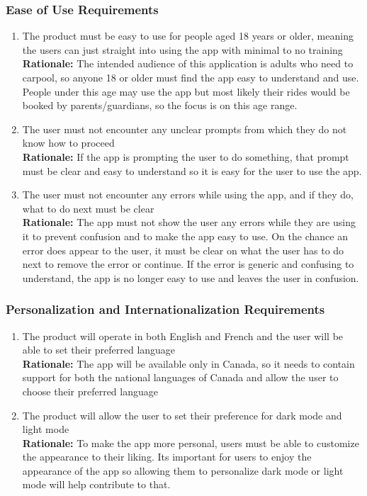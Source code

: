 \documentclass[]{article}
\begin{document}
\subsubsection{Ease of Use Requirements}
\label{ssub:ease_of_use_requirements}
\begin{enumerate}[{UH-EOU}1. ]
	\item The product must be easy to use for people aged 18 years or older, meaning the users can just straight into using the app with minimal to no training \\
	{\bf Rationale:} The intended audience of this application is adults who need to carpool, so anyone 18 or older must find the app easy to understand and use. People under this age may use the app but most likely their rides would be booked by parents/guardians, so the focus is on this age range.
	\item The user must not encounter any unclear prompts from which they do not know how to proceed \\
	{\bf Rationale:} If the app is prompting the user to do something, that prompt must be clear and easy to understand so it is easy for the user to use the app.
	\item The user must not encounter any errors while using the app, and if they do, what to do next must be clear \\
	{\bf Rationale:} The app must not show the user any errors while they are using it to prevent confusion and to make the app easy to use. On the chance an error does appear to the user, it must be clear on what the user has to do next to remove the error or continue. If the error is generic and confusing to understand, the app is no longer easy to use and leaves the user in confusion.
\end{enumerate}

\subsubsection{Personalization and Internationalization Requirements}
\label{ssub:personalization_and_internationalization_requirements}
\begin{enumerate}[{UH-PI}1. ]
	\item The product will operate in both English and French and the user will be able to set their preferred language \\
	{\bf Rationale:} The app will be available only in Canada, so it needs to contain support for both the national languages of Canada and allow the user to choose their preferred language
	\item The product will allow the user to set their preference for dark mode and light mode \\
	{\bf Rationale:} To make the app more personal, users must be able to customize the appearance to their liking. Its important for users to enjoy the appearance of the app so allowing them to personalize dark mode or light mode will help contribute to that.
\end{enumerate}
\end{document}
